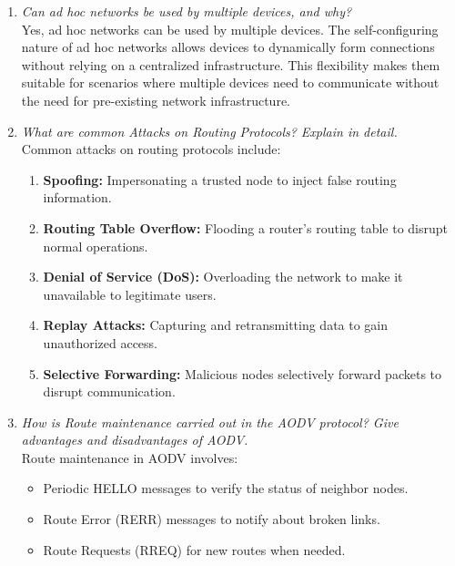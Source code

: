 \documentclass[11pt]{article}
\begin{document}
\begin{enumerate}
    \item \textit{Can ad hoc networks be used by multiple devices, and why?}\\

          Yes, ad hoc networks can be used by multiple devices. The self-configuring nature of ad hoc networks allows devices to dynamically form connections without relying on a centralized infrastructure. This flexibility makes them suitable for scenarios where multiple devices need to communicate without the need for pre-existing network infrastructure.

    \item \textit{What are common Attacks on Routing Protocols? Explain in detail.}\\

          Common attacks on routing protocols include:
          \begin{enumerate}
              \item \textbf{Spoofing:} Impersonating a trusted node to inject false routing information.
              \item \textbf{Routing Table Overflow:} Flooding a router's routing table to disrupt normal operations.
              \item \textbf{Denial of Service (DoS):} Overloading the network to make it unavailable to legitimate users.
              \item \textbf{Replay Attacks:} Capturing and retransmitting data to gain unauthorized access.
              \item \textbf{Selective Forwarding:} Malicious nodes selectively forward packets to disrupt communication.
          \end{enumerate}

    \item \textit{How is Route maintenance carried out in the AODV protocol? Give advantages and disadvantages of AODV.}\\

          Route maintenance in AODV involves:
          \begin{itemize}
              \item Periodic HELLO messages to verify the status of neighbor nodes.
              \item Route Error (RERR) messages to notify about broken links.
              \item Route Requests (RREQ) for new routes when needed.
          \end{itemize}


\end{enumerate}
\end{document}
